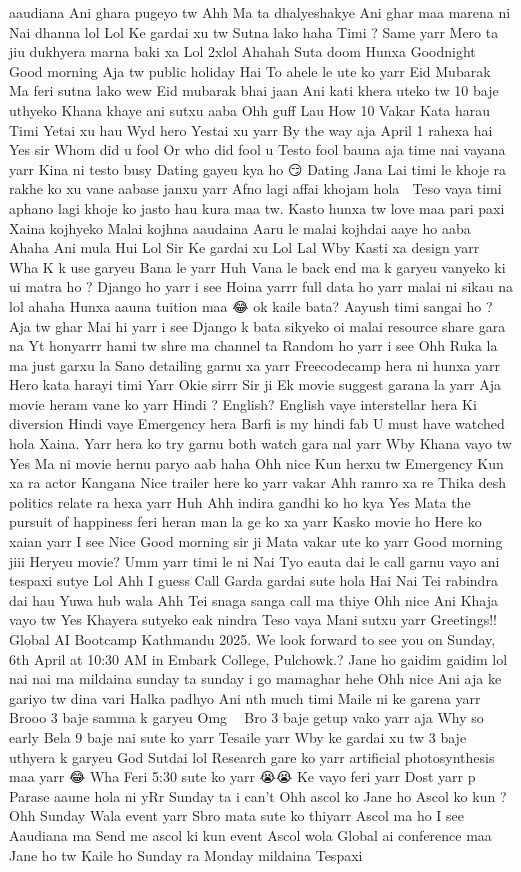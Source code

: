 aaudiana Ani ghara pugeyo tw Ahh Ma ta dhalyeshakye Ani ghar maa marena ni Nai dhanna lol Lol Ke gardai xu tw Sutna lako haha Timi ? Same yarr Mero ta jiu dukhyera marna baki xa Lol 2xlol Ahahah Suta doom Hunxa Goodnight Good morning Aja tw public holiday Hai To ahele le ute ko yarr Eid Mubarak Ma feri sutna lako wew Eid mubarak bhai jaan Ani kati khera uteko tw 10 baje uthyeko Khana khaye ani sutxu aaba Ohh guff Lau How 10 Vakar Kata harau Timi Yetai xu hau Wyd hero Yestai xu yarr By the way aja April 1 rahexa hai Yes sir Whom did u fool Or who did fool u Testo fool bauna aja time nai vayana yarr Kina ni testo busy Dating gayeu kya ho 😏 Dating Jana Lai timi le khoje ra rakhe ko xu vane aabase janxu yarr Afno lagi affai khojam hola 🥹 Teso vaya timi aphano lagi khoje ko jasto hau kura maa tw. Kasto hunxa tw love maa pari paxi Xaina kojhyeko Malai kojhna aaudaina Aaru le malai kojhdai aaye ho aaba Ahaha Ani mula Hui Lol Sir Ke gardai xu Lol Lal Wby Kasti xa design yarr Wha K k use garyeu Bana le yarr Huh Vana le back end ma k garyeu vanyeko ki ui matra ho ? Django ho yarr i see Hoina yarrr full data ho yarr malai ni sikau na lol ahaha Hunxa aauna tuition maa 😂 ok kaile bata? Aayush timi sangai ho ? Aja tw ghar Mai hi yarr i see Django k bata sikyeko oi malai resource share gara na Yt honyarrr hami tw shre ma channel ta Random ho yarr i see Ohh Ruka la ma just garxu la Sano detailing garnu xa yarr Freecodecamp hera ni hunxa yarr Hero kata harayi timi Yarr Okie sirrr Sir ji Ek movie suggest garana la yarr Aja movie heram vane ko yarr Hindi ? English? English vaye interstellar hera Ki diversion Hindi vaye Emergency hera Barfi is my hindi fab U must have watched hola Xaina. Yarr hera ko try garnu both watch gara nal yarr Wby Khana vayo tw Yes Ma ni movie hernu paryo aab haha Ohh nice Kun herxu tw Emergency Kun xa ra actor Kangana Nice trailer here ko yarr vakar Ahh ramro xa re Thika desh politics relate ra hexa yarr Huh Ahh indira gandhi ko ho kya Yes Mata the pursuit of happiness feri heran man la ge ko xa yarr Kasko movie ho Here ko xaian yarr I see Nice Good morning sir ji Mata vakar ute ko yarr Good morning jiii Heryeu movie? Umm yarr timi le ni Nai Tyo eauta dai le call garnu vayo ani tespaxi sutye Lol Ahh I guess Call Garda gardai sute hola Hai Nai Tei rabindra dai hau Yuwa hub wala Ahh Tei snaga sanga call ma thiye Ohh nice Ani Khaja vayo tw Yes Khayera sutyeko eak nindra Teso vaya Mani sutxu yarr Greetings!! Global AI Bootcamp Kathmandu 2025. We look forward to see you on Sunday, 6th April at 10:30 AM in Embark College, Pulchowk.? Jane ho gaidim gaidim lol nai nai ma mildaina sunday ta sunday i go mamaghar hehe Ohh nice Ani aja ke gariyo tw dina vari Halka padhyo Ani nth much timi Maile ni ke garena yarr Brooo 3 baje samma k garyeu Omg 👀👀 Bro 3 baje getup vako yarr aja Why so early Bela 9 baje nai sute ko yarr Tesaile yarr Wby ke gardai xu tw 3 baje uthyera k garyeu God Sutdai lol Research gare ko yarr artificial photosynthesis maa yarr 😂 Wha Feri 5:30 sute ko yarr 😭😭 Ke vayo feri yarr Dost yarr p Parase aaune hola ni yRr Sunday ta i can't Ohh ascol ko Jane ho Ascol ko kun ? Ohh Sunday Wala event yarr Sbro mata sute ko thiyarr Ascol ma ho I see Aaudiana ma Send me ascol ki kun event Ascol wola Global ai conference maa Jane ho tw Kaile ho Sunday ra Monday mildaina Tespaxi 
